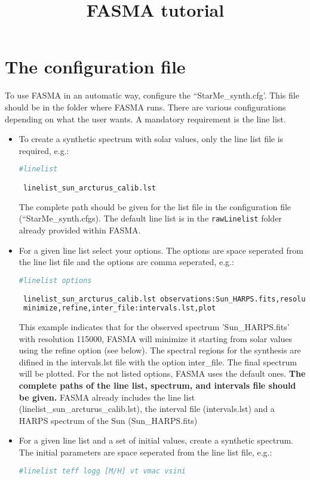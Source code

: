 \documentclass[a4paper,12pt]{article}
\title{FASMA tutorial}
\author{}
\begin{document}
\maketitle


\section{The configuration file}

To use FASMA in an automatic way, configure the ``StarMe\_synth.cfg'. This file should be in the folder where FASMA runs. There are various configurations depending on what the user wants. 
A mandatory requirement is the line list. 

\begin{itemize}
 \item To create a synthetic spectrum with solar values, only the line list file is required, e.g.:
 \begin{lstlisting}[language=Python]
 #linelist

 linelist_sun_arcturus_calib.lst
\end{lstlisting}
The complete path should be given for the list file in the configuration file (``StarMe\_synth.cfgs). The default line list is in the \texttt{rawLinelist} folder already provided within FASMA.
 \item For a given line list select your options. The options are space seperated from the line list file and the options are comma seperated, e.g.:
 {\footnotesize
 \begin{lstlisting}[language=Python]
 #linelist options

 linelist_sun_arcturus_calib.lst observations:Sun_HARPS.fits,resolution:115000,
 minimize,refine,inter_file:intervals.lst,plot
\end{lstlisting}}
This example indicates that for the observed spectrum 'Sun\_HARPS.fits' with resolution 115000, FASMA will minimize it starting from solar values using the refine option (see below). The 
spectral regions for the synthesis are difined in the intervals.lst file with the option inter\_file. The final spectrum will be plotted. 
For the not listed options, FASMA uses the default ones. {\bf The complete paths of the line list, spectrum, and intervals file should be given.} FASMA already includes the 
line list (linelist\_sun\_arcturus\_calib.lst), the interval file (intervals.lst) and a HARPS spectrum of the Sun (Sun\_HARPS.fits)

 \item For a given line list and a set of initial values, create a synthetic spectrum. The initial parameters are space seperated from the line list file, e.g.:
 \begin{lstlisting}[language=Python]
 #linelist teff logg [M/H] vt vmac vsini


\end{lstlisting}
\end{itemize}
\end{document}
